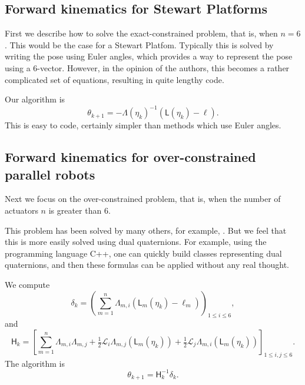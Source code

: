 \documentclass[reqno,12pt]{amsart}
\begin{document}
\subsection{Forward kinematics for Stewart Platforms}
\label{forward kinematics stewart}

First we describe how to solve the exact-constrained problem, that is, when $n= 6$.  This would be the case for a Stewart Platfom.  Typically this is solved by writing the pose using Euler angles, which provides a way to represent the pose using a 6-vector.  However, in the opinion of the authors, this becomes a rather complicated set of equations, resulting in quite lengthy code.

Our algorithm is
\begin{equation}
\label{exact constrained Newton-Raphson}
\theta_{k+1} = - \mathsf \Lambda(\eta_k)^{-1} (\mathsf L(\eta_k) - \bm\ell) .
\end{equation}
This is easy to code, certainly simpler than methods which use Euler angles.

\subsection{Forward kinematics for over-constrained parallel robots}
\label{forward kinematics}

Next we focus on the over-constrained problem, that is, when the number of actuators $n$ is greater than $6$.

This problem has been solved by many others, for example, \cite{pott-schmidt,yang-et-al}.  But we feel that this is more easily solved using dual quaternions.  For example, using the programming language C++, one can quickly build classes representing dual quaternions, and then these formulas can be applied without any real thought.

We compute
\begin{equation}
\delta_k = \left(\sum_{m=1}^n \mathsf \Lambda_{m,i} (\mathsf L_m(\eta_k) - \ell_m)\right)_{1 \le i \le 6},
\end{equation}
and
\begin{equation}
\mathsf H_k
= \left[\sum_{m=1}^n \mathsf\Lambda_{m,i} \mathsf\Lambda_{m,j} + \tfrac12 \mathcal L_i \mathsf \Lambda_{m,j} (\mathsf L_m(\eta_k)) + \tfrac12 \mathcal L_j \mathsf \Lambda_{m,i} (\mathsf L_m(\eta_k))
\right]_{1\le i,j\le 6}.
\end{equation}
The algorithm is
\begin{equation}
\label{over constrained Newton-Raphson}
\theta_{k+1} =  \mathsf H_k^{-1} \delta_k .
\end{equation}
\end{document}
